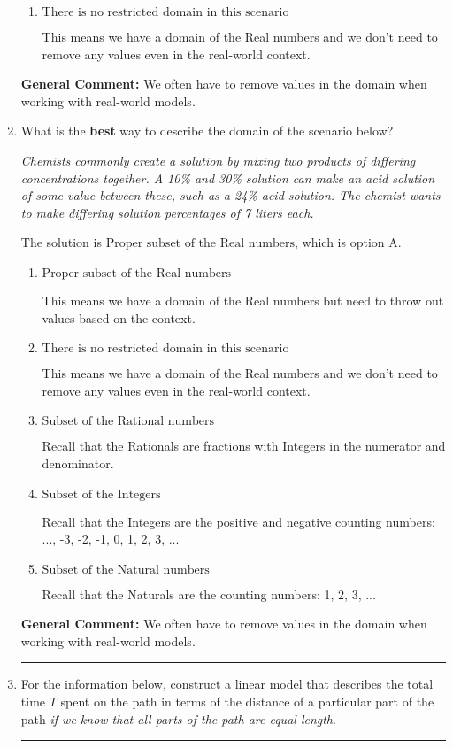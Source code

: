 \documentclass{extbook}[14pt]
\newcommand{\litem}[1]{\item #1

\rule{\textwidth}{0.4pt}}
\begin{document}
\begin{enumerate}
{\begin{enumerate}[label=\Alph*.]
Recall that the Rationals are fractions with Integers in the numerator and denominator.
\item \( \text{There is no restricted domain in this scenario} \)

This means we have a domain of the Real numbers and we don't need to remove any values even in the real-world context.
\end{enumerate}

\textbf{General Comment:} We often have to remove values in the domain when working with real-world models.
}
\litem{
What is the \textbf{best} way to describe the domain of the scenario below?

\begin{center}
    \textit{ Chemists commonly create a solution by mixing two products of differing concentrations together. A 10\% and 30\% solution can make an acid solution of some value between these, such as a 24\% acid solution. The chemist wants to make differing solution percentages of 7 liters each. }
\end{center}


The solution is \( \text{Proper subset of the Real numbers} \), which is option A.\begin{enumerate}[label=\Alph*.]
\item \( \text{Proper subset of the Real numbers} \)

This means we have a domain of the Real numbers but need to throw out values based on the context.
\item \( \text{There is no restricted domain in this scenario} \)

This means we have a domain of the Real numbers and we don't need to remove any values even in the real-world context.
\item \( \text{Subset of the Rational numbers} \)

Recall that the Rationals are fractions with Integers in the numerator and denominator.
\item \( \text{Subset of the Integers} \)

Recall that the Integers are the positive and negative counting numbers: ..., -3, -2, -1, 0, 1, 2, 3, ... 
\item \( \text{Subset of the Natural numbers} \)

Recall that the Naturals are the counting numbers: 1, 2, 3, ...
\end{enumerate}

\textbf{General Comment:} We often have to remove values in the domain when working with real-world models.
}
\litem{
For the information below, construct a linear model that describes the total time $T$ spent on the path in terms of the distance of a particular part of the path \textit{if we know that all parts of the path are equal length}.

}
\end{enumerate}
\end{document}
